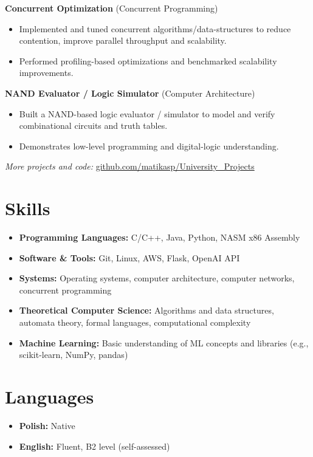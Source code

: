\documentclass[a4paper,10pt]{article}
\begin{document}
\textbf{Concurrent Optimization} \hfill (Concurrent Programming)
\begin{itemize}[left=0pt, noitemsep]
    \item Implemented and tuned concurrent algorithms/data-structures to reduce contention, improve parallel throughput and scalability.
    \item Performed profiling-based optimizations and benchmarked scalability improvements.
\end{itemize}

\textbf{NAND Evaluator / Logic Simulator} \hfill (Computer Architecture)
\begin{itemize}[left=0pt, noitemsep]
    \item Built a NAND-based logic evaluator / simulator to model and verify combinational circuits and truth tables.
    \item Demonstrates low-level programming and digital-logic understanding.
\end{itemize}

\small\textit{More projects and code:} \href{https://github.com/matikasp/University_Projects}{github.com/matikasp/University\_Projects}
\section*{Skills}
\begin{itemize}[left=0pt]
    \item \textbf{Programming Languages:} C/C++, Java, Python, NASM x86 Assembly
    \item \textbf{Software \& Tools:} Git, Linux, AWS, Flask, OpenAI API
    \item \textbf{Systems:} Operating systems, computer architecture, computer networks, concurrent programming
    \item \textbf{Theoretical Computer Science:} Algorithms and data structures, automata theory, formal languages, computational complexity
    \item \textbf{Machine Learning:} Basic understanding of ML concepts and libraries (e.g., scikit-learn, NumPy, pandas)
\end{itemize}

\section*{Languages}
\begin{itemize}[left=0pt]
    \item \textbf{Polish:} Native
    \item \textbf{English:} Fluent, B2 level (self-assessed)
\end{itemize}
\end{document}
